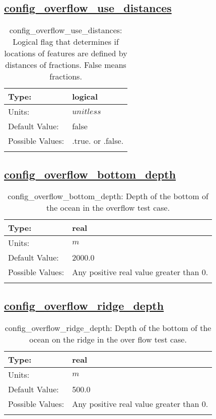 \subsection[config\_overflow\_use\_distances]{\hyperref[sec:nm_tab_overflow]{config\_overflow\_use\_distances}}
\label{subsec:nm_sec_config_overflow_use_distances}
\begin{center}
\begin{longtable}{| p{2.0in} || p{4.0in} |}
    \hline
    Type: & logical \\
    \hline
    Units: & $unitless$ \\
    \hline
    Default Value: & false \\
    \hline
    Possible Values: & .true. or .false. \\
    \hline
    \caption{config\_overflow\_use\_distances: Logical flag that determines if locations of features are defined by distances of fractions. False means fractions.}
\end{longtable}
\end{center}
\subsection[config\_overflow\_bottom\_depth]{\hyperref[sec:nm_tab_overflow]{config\_overflow\_bottom\_depth}}
\label{subsec:nm_sec_config_overflow_bottom_depth}
\begin{center}
\begin{longtable}{| p{2.0in} || p{4.0in} |}
    \hline
    Type: & real \\
    \hline
    Units: & $m$ \\
    \hline
    Default Value: & 2000.0 \\
    \hline
    Possible Values: & Any positive real value greater than 0. \\
    \hline
    \caption{config\_overflow\_bottom\_depth: Depth of the bottom of the ocean in the overflow test case.}
\end{longtable}
\end{center}
\subsection[config\_overflow\_ridge\_depth]{\hyperref[sec:nm_tab_overflow]{config\_overflow\_ridge\_depth}}
\label{subsec:nm_sec_config_overflow_ridge_depth}
\begin{center}
\begin{longtable}{| p{2.0in} || p{4.0in} |}
    \hline
    Type: & real \\
    \hline
    Units: & $m$ \\
    \hline
    Default Value: & 500.0 \\
    \hline
    Possible Values: & Any positive real value greater than 0. \\
    \hline
    \caption{config\_overflow\_ridge\_depth: Depth of the bottom of the ocean on the ridge in the over flow test case.}
\end{longtable}
\end{center}
